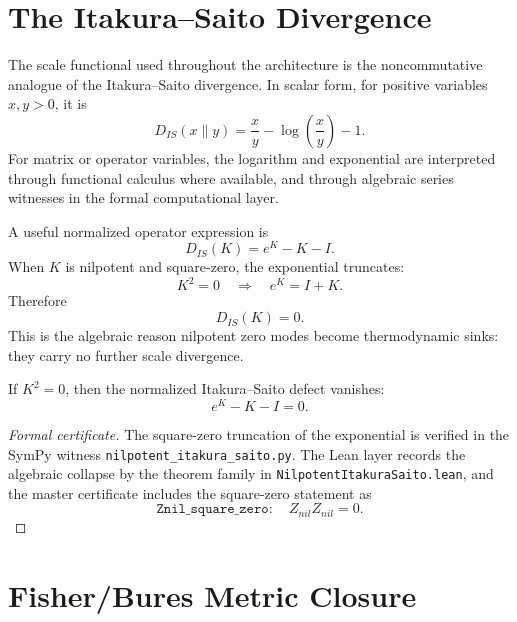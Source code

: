 \section{The Itakura--Saito Divergence}

The scale functional used throughout the architecture is the noncommutative analogue of the Itakura--Saito divergence.  In scalar form, for positive variables $x,y>0$, it is
\begin{equation}
    D_{IS}(x\|y)=\frac{x}{y}-\log\left(\frac{x}{y}\right)-1.
\end{equation}
For matrix or operator variables, the logarithm and exponential are interpreted through functional calculus where available, and through algebraic series witnesses in the formal computational layer.

A useful normalized operator expression is
\begin{equation}
    D_{IS}(K)=e^K-K-I.
\end{equation}
When $K$ is nilpotent and square-zero, the exponential truncates:
\begin{equation}
    K^2=0
    \quad\Longrightarrow\quad
    e^K=I+K.
\end{equation}
Therefore
\begin{equation}
    D_{IS}(K)=0.
\end{equation}
This is the algebraic reason nilpotent zero modes become thermodynamic sinks: they carry no further scale divergence.

\begin{theorem}
If $K^2=0$, then the normalized Itakura--Saito defect vanishes:
\begin{equation}
    e^K-K-I=0.
\end{equation}
\end{theorem}

\begin{proof}[Formal certificate]
The square-zero truncation of the exponential is verified in the SymPy witness \texttt{nilpotent\_itakura\_saito.py}.  The Lean layer records the algebraic collapse by the theorem family in \texttt{NilpotentItakuraSaito.lean}, and the master certificate includes the square-zero statement as
\begin{equation}
    \texttt{Znil\_square\_zero}:\quad Z_{nil}Z_{nil}=0.
\end{equation}
\end{proof}

\section{Fisher/Bures Metric Closure}

